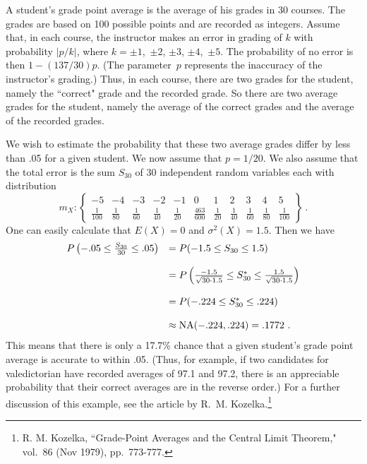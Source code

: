\begin{example}\label{exam 9.9}
A student's grade point average is the average of his grades in 30
courses.  The grades are based on 100 possible points and are recorded as integers.  Assume that,
in each course, the instructor makes an error in grading of
$k$ with probability
$|p/k|$, where $k = \pm1$,~$\pm2$, $\pm3$, $\pm4$,~$\pm5$.  The probability of
no error is then $1 - (137/30)p$.  (The parameter~$p$ represents the inaccuracy
of the instructor's grading.)  Thus, in each course, there are two grades for the student, namely
the ``correct" grade and the recorded grade.  So there are two average grades for the student,
namely the average of the correct grades and the average of the recorded grades.
\par
We wish to estimate the probability that these two average grades differ by less than .05 for a given
student.  We now assume that $p = 1/20$.  We also assume that the total error
is the sum $S_{30}$ of 30 independent random variables each with distribution
$$
m_X: \left\{ 
\begin{array}{ccccccccccc}
-5 & -4 & -3 & -2 & -1 & 0 & 1 & 2 & 3 & 4 & 5 \\
\frac1{100} & \frac1{80} & \frac1{60} & \frac1{40} & \frac1{20} & 
\frac{463}{600} & \frac1{20} & \frac1{40} & \frac1{60} & \frac1{80} &
\frac1{100}
\end{array} 
\right \}\ .
$$
One can easily calculate that $E(X) = 0$ and 
$\sigma^2(X) = 1.5$.  Then we have
$$\begin{array}{ll}
P\left(-.05 \leq \frac {S_{30}}{30} \leq .05 \right) &= P(-1.5 \leq S_{30} \leq1.5) \\
     & \\
     &= P\left(\frac {-1.5}{\sqrt{30\cdot1.5}} \leq S_{30}^* \leq \frac {1.5}{\sqrt{30\cdot1.5}} \right) \\
     & \\
     &= P(-.224 \leq S_{30}^* \leq .224) \\
     & \\
     &\approx   {\rm NA}(-.224, .224) = .1772\ .  
\end{array}$$
This means that there is only a 17.7\% chance that a given student's grade point average is
accurate to within .05.  (Thus, for example, if two candidates for valedictorian have recorded
averages of 97.1 and 97.2, there is an appreciable probability that their correct averages are
in the reverse order.)  For a further discussion of this example, see the article by R.~M.
Kozelka.\footnote{R. M. Kozelka, ``Grade-Point Averages and the Central Limit
Theorem,"  vol.~86 (Nov 1979), pp.~773-777.}
\end{example}



